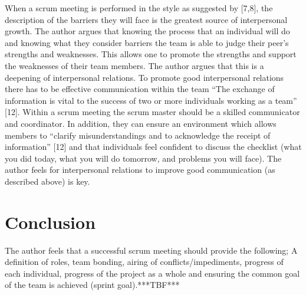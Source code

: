 \documentclass{scrartcl}
\begin{document}
When a scrum meeting is performed in the style as suggested by [7,8], the description of the barriers they will face is the greatest source of interpersonal growth. The author argues that knowing the process that an individual will do and knowing what they consider barriers the team is able to judge their peer’s strengths and weaknesses. This allows one to promote the strengths and support the weaknesses of their team members. The author argues that this is a deepening of interpersonal relations.
To promote good interpersonal relations there has to be effective communication within the team “The exchange of information is vital to the success of two or more individuals working as a team” [12]. Within a scrum meeting the scrum master should be a skilled communicator and coordinator. In addition, they can ensure an environment which allows members to “clarify misunderstandings and to acknowledge the receipt of information” [12] and that individuals feel confident to discuss the checklist (what you did today, what you will do tomorrow, and problems you will face). The author feels for interpersonal relations to improve good communication (as described above) is key. 


\section{Conclusion}

The author feels that a successful scrum meeting should provide the following; A definition of roles, team bonding, airing of conflicts/impediments, progress of each individual, progress of the project as a whole and ensuring the common goal of the team is achieved (sprint goal).***TBF*** 



\end{document}
